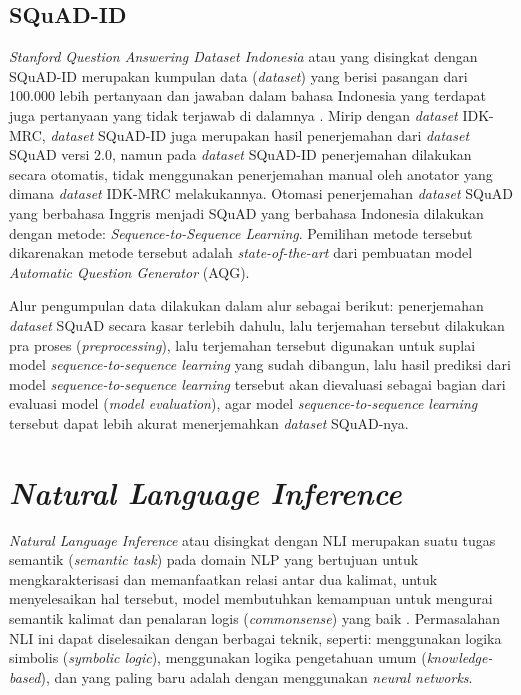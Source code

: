 \subsection{SQuAD-ID}
\emph{Stanford Question Answering Dataset Indonesia} atau yang disingkat dengan SQuAD-ID merupakan kumpulan data (\emph{dataset}) yang berisi pasangan dari 100.000 lebih pertanyaan dan jawaban dalam bahasa Indonesia yang terdapat juga pertanyaan yang tidak terjawab di dalamnya \citep{muis2020sequencetosequence}. Mirip dengan \emph{dataset} IDK-MRC, \emph{dataset} SQuAD-ID juga merupakan hasil penerjemahan dari \emph{dataset} SQuAD versi 2.0, namun pada \emph{dataset} SQuAD-ID penerjemahan dilakukan secara otomatis, tidak menggunakan penerjemahan manual oleh anotator yang dimana \emph{dataset} IDK-MRC melakukannya. Otomasi penerjemahan \emph{dataset} SQuAD yang berbahasa Inggris menjadi SQuAD yang berbahasa Indonesia dilakukan dengan metode: \emph{Sequence-to-Sequence Learning}. Pemilihan metode tersebut dikarenakan metode tersebut adalah \emph{state-of-the-art} dari pembuatan model \emph{Automatic Question Generator} (AQG). 

Alur pengumpulan data dilakukan dalam alur sebagai berikut: penerjemahan \emph{dataset} SQuAD secara kasar terlebih dahulu, lalu terjemahan tersebut dilakukan pra proses (\emph{preprocessing}), lalu terjemahan tersebut digunakan untuk suplai model \emph{sequence-to-sequence learning} yang sudah dibangun, lalu hasil prediksi dari model \emph{sequence-to-sequence learning} tersebut akan dievaluasi sebagai bagian dari evaluasi model (\emph{model evaluation}), agar model \emph{sequence-to-sequence learning} tersebut dapat lebih akurat menerjemahkan \emph{dataset} SQuAD-nya.

\section{\emph{Natural Language Inference}}
\emph{Natural Language Inference} atau disingkat dengan NLI merupakan suatu tugas semantik (\emph{semantic task}) pada domain NLP yang bertujuan untuk mengkarakterisasi dan memanfaatkan relasi antar dua kalimat, untuk menyelesaikan hal tersebut, model membutuhkan kemampuan untuk mengurai semantik kalimat dan penalaran logis (\emph{commonsense}) yang baik \citep{bowman-etal-2015-large}. Permasalahan NLI ini dapat diselesaikan dengan berbagai teknik, seperti: menggunakan logika simbolis (\emph{symbolic logic}), menggunakan logika pengetahuan umum (\emph{knowledge-based}), dan yang paling baru adalah dengan menggunakan \emph{neural networks}. 

